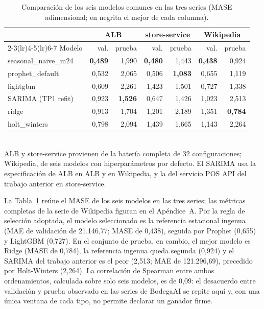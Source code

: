 \begin{table}[htbp]
  \centering
  \caption{Comparación de los seis modelos comunes en las tres series (MASE adimensional; en negrita el mejor de cada columna).}
  \label{tab:comparacion_tres_series}
  \small
  \begin{tabular}{lrrrrrr}
    \toprule
    & \multicolumn{2}{c}{ALB} & \multicolumn{2}{c}{store-service} & \multicolumn{2}{c}{Wikipedia} \\
    \cmidrule(lr){2-3}\cmidrule(lr){4-5}\cmidrule(lr){6-7}
    Modelo & val. & prueba & val. & prueba & val. & prueba \\
    \midrule
    seasonal\_naive\_m24 & \textbf{0,489} & 1,990 & \textbf{0,480} & 1,443 & \textbf{0,438} & 0,924 \\
    prophet\_default & 0,532 & 2,065 & 0,506 & \textbf{1,083} & 0,655 & 1,119 \\
    lightgbm & 0,609 & 2,261 & 1,423 & 1,501 & 0,727 & 1,338 \\
    SARIMA (TP1 refit) & 0,923 & \textbf{1,526} & 0,647 & 1,426 & 1,023 & 2,513 \\
    ridge & 0,913 & 1,704 & 1,201 & 2,189 & 1,351 & \textbf{0,784} \\
    holt\_winters & 0,798 & 2,094 & 1,439 & 1,665 & 1,143 & 2,264 \\
    \bottomrule
  \end{tabular}
  \\[2pt]
  \footnotesize ALB y store-service provienen de la batería completa de 32 configuraciones; Wikipedia, de seis modelos con
  hiperparámetros por defecto. El SARIMA usa la especificación de ALB en ALB y en Wikipedia, y la del servicio POS API del
  trabajo anterior en store-service.
\end{table}

La Tabla~\ref{tab:comparacion_tres_series} reúne el MASE de los seis modelos en las tres series; las métricas completas de la serie de
Wikipedia figuran en el Apéndice~A. Por la regla de selección adoptada, el modelo seleccionado es la referencia estacional ingenua (MAE de
validación de 21.146,77; MASE de 0,438), seguida por Prophet (0,655) y LightGBM
(0,727). En el conjunto de prueba, en cambio, el mejor modelo es Ridge (MASE de
0,784), la referencia ingenua queda segunda (0,924) y el SARIMA del trabajo anterior es
el peor (2,513; MAE de 121.296,69), precedido por Holt-Winters
(2,264). La correlación de Spearman entre ambos ordenamientos, calculada sobre solo seis
modelos, es de 0,09: el desacuerdo entre validación y prueba observado en las series de BodegaAI se
repite aquí y, con una única ventana de cada tipo, no permite declarar un ganador firme.

